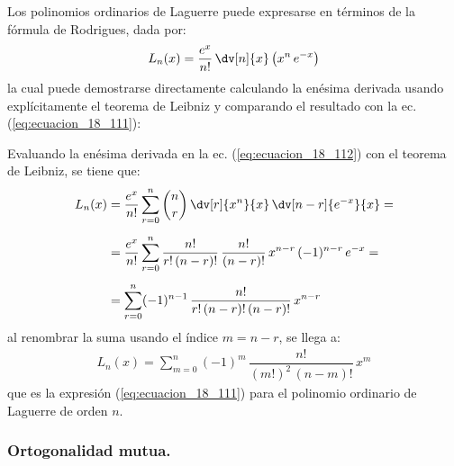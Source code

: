 Los polinomios ordinarios de Laguerre puede expresarse en términos de la fórmula de Rodrigues, dada por:
\begin{align}
L_{n} (x) = \dfrac{e^{x}}{n!} \, \dv[n]{x} \left( x^{n} \, e^{-x} \right)
\label{eq:ecuacion_18_112}
\end{align}
la cual puede demostrarse directamente calculando la enésima derivada usando explícitamente el teorema de Leibniz y comparando el resultado con la ec. (\ref{eq:ecuacion_18_111}):
\par
Evaluando la enésima derivada en la ec. (\ref{eq:ecuacion_18_112}) con el teorema de Leibniz, se tiene que:
\begin{align*}
L_{n}(x) &= \dfrac{e^{x}}{n!} \sum_{r=0}^{n} \binom{n}{r} \, \dv[r]{x^{n}}{x} \, \dv[n-r]{e^{-x}}{x} = \\[0.5em]
&= \dfrac{e^{x}}{n!} \sum_{r=0}^{n}  \dfrac{n!}{r! \, (n - r)!} \, \dfrac{n!}{(n - r)!} \, x^{n-r} \, (-1)^{n-r} \, e^{-x} = \\[0.5em]
&= \sum_{r=0}^{n} (-1)^{n-1} \, \dfrac{n!}{r! \, (n - r)! \, (n - r)!} \, x^{n-r}
\end{align*}
al renombrar la suma usando el índice $m = n - r$, se llega a:
\begin{align*}
L_{n}(x) = \sum_{m=0}^{n} (-1)^{m} \, \dfrac{n!}{(m!)^{2} \, (n - m)!} \, x^{m}
\end{align*}
que es la expresión (\ref{eq:ecuacion_18_111}) para el polinomio ordinario de Laguerre de orden $n$.

\subsubsection{Ortogonalidad mutua.}


